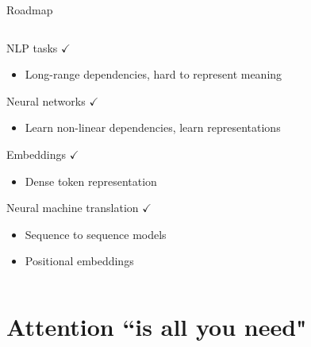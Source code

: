 \documentclass[12pt,aspectratio=169,handout]{beamer}
\begin{document}
\begin{frame}{Roadmap}
	
	\begin{columns}
		
		\begin{column}{0.5\linewidth}
			
			
			NLP tasks $\checkmark$
			
			\begin{itemize}
				\item {\scriptsize Long-range dependencies, hard to represent meaning}
			\end{itemize}
			
			Neural networks $\checkmark$
			
			\begin{itemize}
				\item {\scriptsize Learn non-linear dependencies, learn representations}
			\end{itemize}
			
			Embeddings $\checkmark$
			
			\begin{itemize}
				\item {\scriptsize Dense token representation}
			\end{itemize}
			
			Neural machine translation $\checkmark$
			
			\begin{itemize}
				\item {\scriptsize Sequence to sequence models}
				\item {\scriptsize Positional embeddings}
			\end{itemize}
			
		\end{column}
		
		\begin{column}{0.5\linewidth}
			
			
		\end{column}
		
	\end{columns}
	
\end{frame}

\section{Attention ``is all you need"}
\end{document}
